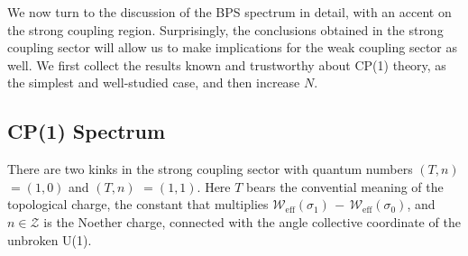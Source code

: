 \documentclass[epsfig,12pt]{article}
\newcommand{\mc}[1]{\mathcal{#1}}
\newcommand{\W}{\mathcal{W}}
\begin{document}
	We now turn to the discussion of the BPS spectrum in detail, 
	with an accent on the strong coupling region.
	Surprisingly, the conclusions obtained in the strong coupling sector will allow us
	to make implications for the weak coupling sector as well.
	We first collect the results known and trustworthy about CP(1) theory,
	as the simplest and well-studied case, and then increase $ N $.

\subsection{CP(1) Spectrum}
\label{seccp1}

	There are two kinks in the strong coupling sector with quantum numbers
	$ (T, n) $ $ = (1, 0) $ and $ (T, n) $ $ = (1, 1) $.
	Here $ T $ bears the convential meaning of the topological charge, the
	constant that multiplies $ \W_\text{eff}(\sigma_1) \,-\, \W_\text{eff}(\sigma_0) $,
	and $ n \in \mc{Z} $ is the Noether charge, connected with the angle collective
	coordinate of the unbroken U(1).
\end{document}
